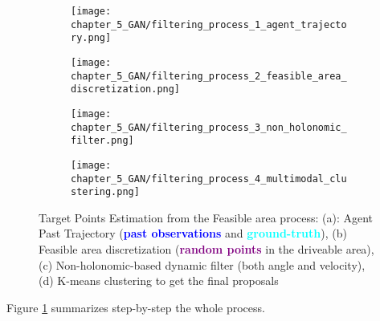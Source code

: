 \begin{figure}[!ht]
	\centering
	\begin{subfigure}{0.24\textwidth}
		\texttt{[image: chapter\_5\_GAN/filtering\_process\_1\_agent\_trajectory.png]}	
		\caption{}
	\end{subfigure}
	\hfill
	\begin{subfigure}{0.24\textwidth}
		\texttt{[image: chapter\_5\_GAN/filtering\_process\_2\_feasible\_area\_discretization.png]}
		\caption{}
	\end{subfigure}
	\hfill
	\begin{subfigure}{0.24\textwidth}
		\texttt{[image: chapter\_5\_GAN/filtering\_process\_3\_non\_holonomic\_filter.png]}
		\caption{}
	\end{subfigure}
	\hfill
	\begin{subfigure}{0.24\textwidth}
		\texttt{[image: chapter\_5\_GAN/filtering\_process\_4\_multimodal\_clustering.png]}
		\caption{}
	\end{subfigure}
	\captionsetup{justification=justified}
	\caption[Target Points Estimation from the Feasible area process]{Target Points Estimation from the Feasible area process: (a): Agent Past Trajectory (\textbf{\textcolor{blue}{past observations}} and \textbf{\textcolor{aqua}{ground-truth}}), (b) Feasible area discretization (\textbf{\textcolor{purple}{random points}} in the driveable area), (c) Non-holonomic-based dynamic filter (both angle and velocity), (d) K-means clustering to get the final proposals}
	\label{fig:chapter_5_GAN/target_points_extraction}
\end{figure}

Figure \ref{fig:chapter_5_GAN/target_points_extraction} summarizes step-by-step the whole process.

